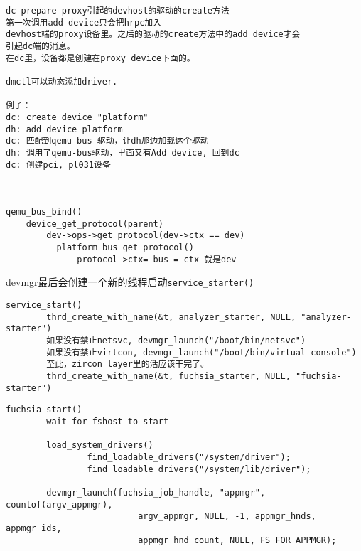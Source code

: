 \begin{verbatim}
dc prepare proxy引起的devhost的驱动的create方法
第一次调用add device只会把hrpc加入
devhost端的proxy设备里。之后的驱动的create方法中的add device才会
引起dc端的消息。
在dc里，设备都是创建在proxy device下面的。

dmctl可以动态添加driver.

例子：
dc: create device "platform"
dh: add device platform
dc: 匹配到qemu-bus 驱动，让dh那边加载这个驱动
dh: 调用了qemu-bus驱动，里面又有Add device, 回到dc
dc: 创建pci, pl031设备



qemu_bus_bind()
    device_get_protocol(parent)
        dev->ops->get_protocol(dev->ctx == dev)
          platform_bus_get_protocol()
              protocol->ctx= bus = ctx 就是dev
\end{verbatim}

devmgr最后会创建一个新的线程启动\verb|service_starter()|
\begin{verbatim}
service_start()
        thrd_create_with_name(&t, analyzer_starter, NULL, "analyzer-starter")
        如果没有禁止netsvc, devmgr_launch("/boot/bin/netsvc")
        如果没有禁止virtcon, devmgr_launch("/boot/bin/virtual-console")
        至此，zircon layer里的活应该干完了。
        thrd_create_with_name(&t, fuchsia_starter, NULL, "fuchsia-starter")
\end{verbatim}

\begin{verbatim}
fuchsia_start()
        wait for fshost to start
        
        load_system_drivers()
                find_loadable_drivers("/system/driver");
                find_loadable_drivers("/system/lib/driver");

        devmgr_launch(fuchsia_job_handle, "appmgr", countof(argv_appmgr),
                          argv_appmgr, NULL, -1, appmgr_hnds, appmgr_ids,
                          appmgr_hnd_count, NULL, FS_FOR_APPMGR);

\end{verbatim}

              